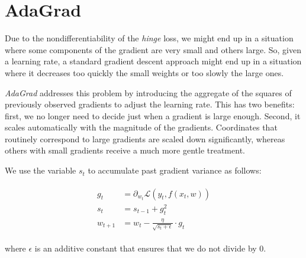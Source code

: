 \section{AdaGrad}

Due to the nondifferentiability of the \emph{hinge} loss, we might end up in a situation where some components of the gradient are very small and others large. So, given a learning rate, a standard gradient descent approach might end up in a situation where it decreases too quickly the small weights or too slowly the large ones.

\emph{AdaGrad} \cite{duchi2011adaptive} addresses this problem by introducing the aggregate of the squares of previously observed gradients to adjust the learning rate. This has two benefits: first, we no longer need to decide just when a gradient is large enough. Second, it scales automatically with the magnitude of the gradients. Coordinates that routinely correspond to large gradients are scaled down significantly, whereas others with small gradients receive a much more gentle treatment.

We use the variable $s_t$ to accumulate past gradient variance as follows:
	
\begin{equation} \label{eq:adagrad}
	\begin{split}
    	\begin{aligned}
        	g_t & = \partial_{{w_t}} \mathcal{L}(y_t, f(x_t, w)) \\
        	s_t & = s_{t-1} + g_t^2 \\
        	w_{t+1} & = w_t - \frac{\eta}{\sqrt{s_t + \epsilon}} \cdot g_t
    	\end{aligned}
	\end{split}
\end{equation}

where $\epsilon$ is an additive constant that ensures that we do not divide by 0. 
